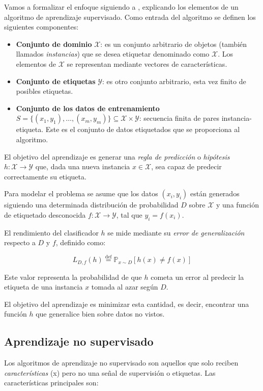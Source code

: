 Vamos a formalizar el enfoque siguiendo a \cite{shalev2014understanding}, explicando los elementos de un algoritmo de aprendizaje supervisado. Como entrada del algoritmo se definen los siguientes componentes:

\begin{itemize}
    \item \textbf{Conjunto de dominio} $\mathcal{X}$: es un conjunto arbitrario de objetos (también llamados \emph{instancias}) que se desea etiquetar denominado como $\mathcal{X}$. Los elementos de $\mathcal{X}$ se representan mediante vectores de características.
    
    \item \textbf{Conjunto de etiquetas} $\mathcal{Y}$: es otro conjunto arbitrario, esta vez finito de posibles etiquetas. 
    
    \item \textbf{Conjunto de los datos de entrenamiento} $S = \{(x_1, y_1), \ldots, (x_m, y_m)\} \subseteq \mathcal{X} \times \mathcal{Y}$: secuencia finita de pares instancia-etiqueta. Este es el conjunto de datos etiquetados que se proporciona al algoritmo.
\end{itemize}

El objetivo del aprendizaje es generar una \textit{regla de predicción} o \emph{hipótesis} $h: \mathcal{X} \to \mathcal{Y}$ que, dada una nueva instancia $x \in \mathcal{X}$, sea capaz de predecir correctamente su etiqueta. 

Para modelar el problema se asume que los datos $(x_i, y_i)$ están generados siguiendo una determinada distribución de probabilidad $D$ sobre $\mathcal{X}$ y una función de etiquetado desconocida $f: \mathcal{X} \to \mathcal{Y}$, tal que $y_i = f(x_i)$.


El rendimiento del clasificador $h$ se mide mediante su \textit{error de generalización} respecto a $D$ y $f$, definido como:

\begin{equation}
L_{D, f}(h) \overset{\text{def}}{=} \mathbb{P}_{x \sim D} \left[ h(x) \neq f(x) \right]
\end{equation}

Este valor representa la probabilidad de que $h$ cometa un error al predecir la etiqueta de una instancia $x$ tomada al azar según $D$.

El objetivo del aprendizaje es minimizar esta cantidad, es decir, encontrar una función $h$ que generalice bien sobre datos no vistos.


\subsection{Aprendizaje no supervisado} 
Los algoritmos de aprendizaje no supervisado son aquellos que solo reciben \emph{características} (x) pero no una señal de supervisión o etiquetas. Las características principales son: 

